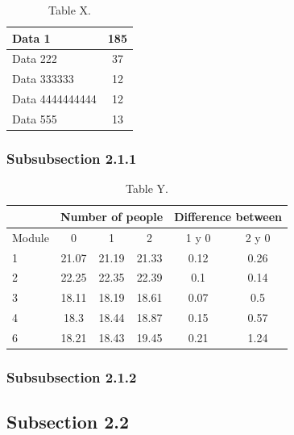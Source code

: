 \documentclass{article} %
\begin{document}
\begin{table}[H]
	\centering
		\begin{tabular}{||l | c ||}
			\hline
			\hline
			Data 1 & 185\\
			\hline
			Data 222 & 37\\
			\hline
			Data 333333 & 12\\
			\hline
			Data 4444444444 & 12\\
			\hline
			Data 555 & 13\\
			\hline
			\hline
		\end{tabular}
		\caption{Table X.}
	\label{tab:table-x}
\end{table}

\subsubsection{Subsubsection 2.1.1}

\begin{table}[H]
	\centering
		\begin{tabular}{||l || c | c | c | c | c ||}
			\hline
			\hline
			& \multicolumn{3}{c|}{Number of people} & \multicolumn{2}{c||}{Difference between}\\
			\hline
			Module & 0 & 1 & 2 & 1 y 0 & 2 y 0\\
			\hline			
			\hline
			1 & 21.07 & 21.19 & 21.33 & 0.12 & 0.26\\
			\hline
			2 & 22.25 & 22.35 & 22.39 & 0.1 & 0.14\\
			\hline
			3 & 18.11 & 18.19 & 18.61 & 0.07 & 0.5\\
			\hline
			4 & 18.3 & 18.44 & 18.87 & 0.15 & 0.57\\
			\hline
			6 & 18.21 & 18.43 & 19.45 & 0.21 & 1.24\\
			\hline
			\hline
		\end{tabular}
		\caption{Table Y.}
	\label{tab:table-y}
\end{table}

\subsubsection{Subsubsection 2.1.2}

\subsection{Subsection 2.2}

\cleardoublepage

\appendix
\clearpage
\addappheadtotoc
\appendixpage
\end{document}
